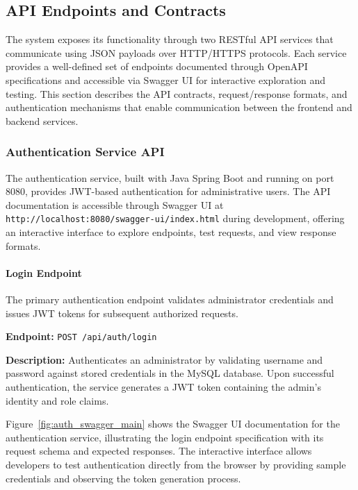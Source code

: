 \documentclass[12pt,a4paper]{article}
\begin{document}
\subsection{API Endpoints and Contracts}

The system exposes its functionality through two RESTful API services that communicate using JSON payloads over HTTP/HTTPS protocols. Each service provides a well-defined set of endpoints documented through OpenAPI specifications and accessible via Swagger UI for interactive exploration and testing. This section describes the API contracts, request/response formats, and authentication mechanisms that enable communication between the frontend and backend services.

\subsubsection{Authentication Service API}

The authentication service, built with Java Spring Boot and running on port 8080, provides JWT-based authentication for administrative users. The API documentation is accessible through Swagger UI at \texttt{http://localhost:8080/swagger-ui/index.html} during development, offering an interactive interface to explore endpoints, test requests, and view response formats.

\paragraph{Login Endpoint}

The primary authentication endpoint validates administrator credentials and issues JWT tokens for subsequent authorized requests.\newline

\textbf{Endpoint:} \texttt{POST /api/auth/login}

\textbf{Description:} Authenticates an administrator by validating username and password against stored credentials in the MySQL database. Upon successful authentication, the service generates a JWT token containing the admin's identity and role claims.\newline

Figure~\ref{fig:auth_swagger_main} shows the Swagger UI documentation for the authentication service, illustrating the login endpoint specification with its request schema and expected responses. The interactive interface allows developers to test authentication directly from the browser by providing sample credentials and observing the token generation process.\newline
\end{document}
